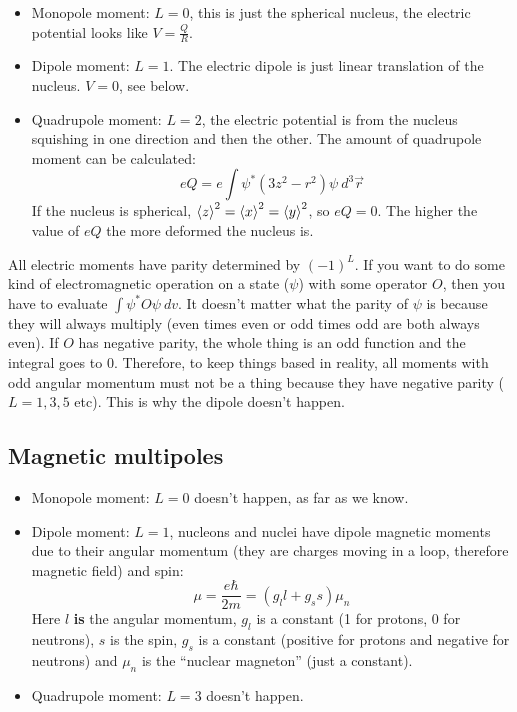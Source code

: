 \documentclass[letter]{article}
\begin{document}
\begin{itemize}
\item Monopole moment: $L=0$, this is just the spherical nucleus, the electric
  potential looks like $V = \frac{Q}{R}$.
\item Dipole moment: $L=1$. The electric dipole is just linear
  translation of the nucleus. $V=0$, see below.
\item Quadrupole moment: $L=2$, the electric potential is from the
  nucleus squishing in one direction and then the other. The amount of
  quadrupole moment can be calculated:
  \begin{equation*}
    eQ=e\int\psi^*(3z^2-r^2)\psi~d^3\vec{r}
  \end{equation*}
  If the nucleus is spherical,
  $\braket{z}^2=\braket{x}^2=\braket{y}^2$, so $eQ=0$. The higher the
  value of $eQ$ the more deformed the nucleus is.
\end{itemize}

All electric moments have parity determined by $(-1)^L$. If you want
to do some kind of electromagnetic operation on a state ($\psi$) with
some operator $O$, then you have to evaluate $\int\psi^*O\psi~dv$. It
doesn't matter what the parity of $\psi$ is because they will always
multiply (even times even or odd times odd are both always even). If
$O$ has negative parity, the whole thing is an odd function and the
integral goes to 0. Therefore, to keep things based in reality, all
 moments with odd angular momentum must not be a thing because they
 have negative parity ($L=1,3,5$ etc). This is why the dipole doesn't happen.

\subsection{Magnetic multipoles}

\begin{itemize}
\item Monopole moment: $L=0$ doesn't happen, as far as we know.
\item Dipole moment: $L=1$, nucleons and nuclei have dipole magnetic
  moments due to their angular momentum (they are charges moving in a
  loop, therefore magnetic field) and spin:
  \begin{equation*}
    \mu = \frac{e\hbar}{2m}=(g_ll+g_ss)\mu_n
  \end{equation*}
Here $l$ \textbf{is} the angular momentum, $g_l$ is a constant (1 for
protons, 0 for neutrons), $s$ is the spin, $g_s$ is a constant
(positive for protons and negative for neutrons)  and $\mu_n$ is the ``nuclear magneton'' (just
a constant).\cite[pp. 73]{krane}
\item Quadrupole moment: $L=3$ doesn't happen.
\end{itemize}
\end{document}
